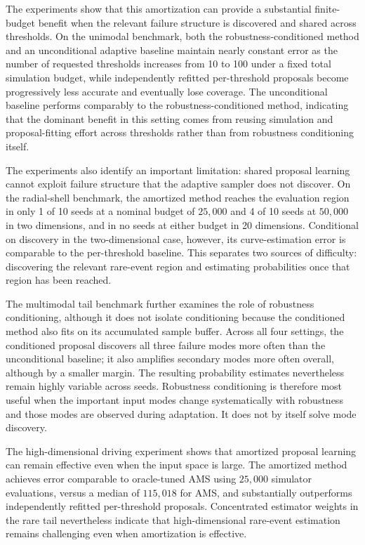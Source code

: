 \documentclass[twoside,11pt]{article}
\begin{document}
The experiments show that this amortization can provide a substantial finite-budget benefit when the relevant failure structure is discovered and shared across thresholds. On the unimodal benchmark, both the robustness-conditioned method and an unconditional adaptive baseline maintain nearly constant error as the number of requested thresholds increases from 10 to 100 under a fixed total simulation budget, while independently refitted per-threshold proposals become progressively less accurate and eventually lose coverage. The unconditional baseline performs comparably to the robustness-conditioned method, indicating that the dominant benefit in this setting comes from reusing simulation and proposal-fitting effort across thresholds rather than from robustness conditioning itself.

The experiments also identify an important limitation: shared proposal learning cannot exploit failure structure that the adaptive sampler does not discover. On the radial-shell benchmark, the amortized method reaches the evaluation region in only 1 of 10 seeds at a nominal budget of $25{,}000$ and 4 of 10 seeds at $50{,}000$ in two dimensions, and in no seeds at either budget in 20 dimensions. Conditional on discovery in the two-dimensional case, however, its curve-estimation error is comparable to the per-threshold baseline. This separates two sources of difficulty: discovering the relevant rare-event region and estimating probabilities once that region has been reached.

The multimodal tail benchmark further examines the role of robustness conditioning, although it does not isolate conditioning because the conditioned method also fits on its accumulated sample buffer. Across all four settings, the conditioned proposal discovers all three failure modes more often than the unconditional baseline; it also amplifies secondary modes more often overall, although by a smaller margin. The resulting probability estimates nevertheless remain highly variable across seeds. Robustness conditioning is therefore most useful when the important input modes change systematically with robustness and those modes are observed during adaptation. It does not by itself solve mode discovery.

The high-dimensional driving experiment shows that amortized proposal learning can remain effective even when the input space is large. The amortized method achieves error comparable to oracle-tuned AMS using $25{,}000$ simulator evaluations, versus a median of $115{,}018$ for AMS, and substantially outperforms independently refitted per-threshold proposals. Concentrated estimator weights in the rare tail nevertheless indicate that high-dimensional rare-event estimation remains challenging even when amortization is effective.
\end{document}
